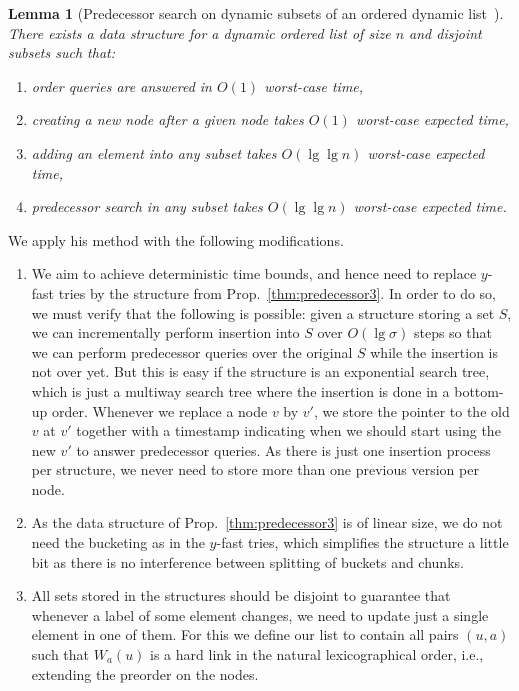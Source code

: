 \documentclass[11pt,onecolumn,final]{article} \usepackage{a4}
\theoremstyle{plain}
\newtheorem{lemma}[definition]{Lemma}
\theoremstyle{remark}
\begin{document}
\begin{lemma}[Predecessor search on dynamic subsets of an ordered dynamic list~\cite{Kopelot12indexing}]
There exists a data structure for a dynamic ordered list of size $n$ and disjoint subsets such that:
\begin{enumerate}
\item order queries are answered in $O(1)$ worst-case time,
\item creating a new node after a given node takes $O(1)$ worst-case expected time,
\item adding an element into any subset takes $O(\lg\lg n)$ worst-case expected time,
\item predecessor search in any subset takes $O(\lg\lg n)$ worst-case expected time.
\end{enumerate}
\end{lemma}

We apply his method with the following modifications.

\begin{enumerate}
\item We aim to achieve deterministic time bounds, and hence need to replace $y$-fast tries by the structure from Prop.~\ref{thm:predecessor3}. In order to do so, we must verify that the following is possible: given a structure storing a set $S$, we can incrementally perform insertion into $S$ over $O(\lg\sigma)$ steps so that we can perform predecessor queries over the original $S$ while the insertion is not over yet. But this is easy if the structure is an exponential search tree, which is just a multiway search tree where the insertion is done in a bottom-up order. Whenever we replace a node $v$ by $v'$, we store the pointer to the old $v$ at $v'$ together with a timestamp indicating when we should start using the new $v'$ to answer predecessor queries. As there is just one insertion process per structure, we never need to store more than one previous version per node.
\item As the data structure of Prop.~\ref{thm:predecessor3} is of linear size, we do not need the bucketing as in the $y$-fast tries, which simplifies the structure a little bit as there is no interference between splitting of buckets and chunks.
\item All sets stored in the structures should be disjoint to guarantee that whenever a label of some element changes, we need to update just a single element in one of them. For this we define our list to contain all pairs $(u,a)$ such that $W_a(u)$ is a hard link in the natural lexicographical order, i.e., extending the preorder on the nodes.
\end{enumerate}
\end{document}
